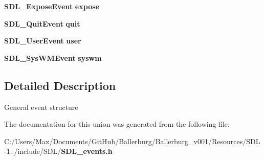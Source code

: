 \begin{DoxyCompactItemize}
\item 
{\bf S\+D\+L\+\_\+\+Expose\+Event} {\bfseries expose}\label{union_s_d_l___event_ae70b3cbeb6e05e3e1322a906c9fbe7d5}

\item 
{\bf S\+D\+L\+\_\+\+Quit\+Event} {\bfseries quit}\label{union_s_d_l___event_a102a3008afe67a1c02ae7504e232dcef}

\item 
{\bf S\+D\+L\+\_\+\+User\+Event} {\bfseries user}\label{union_s_d_l___event_ab7c394e3ce7bf1e4f8d68bc0e9f1b042}

\item 
{\bf S\+D\+L\+\_\+\+Sys\+W\+M\+Event} {\bfseries syswm}\label{union_s_d_l___event_ab3b2eaf5348d4c50a51b1f297fdef537}

\end{DoxyCompactItemize}


\subsection{Detailed Description}
General event structure 

The documentation for this union was generated from the following file\+:\begin{DoxyCompactItemize}
\item 
C\+:/\+Users/\+Max/\+Documents/\+Git\+Hub/\+Ballerburg/\+Ballerburg\+\_\+v001/\+Resources/\+S\+D\+L-\/1../include/\+S\+D\+L/{\bf S\+D\+L\+\_\+events.\+h}\end{DoxyCompactItemize}
